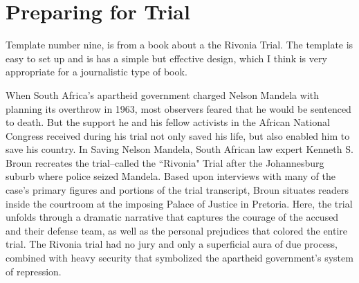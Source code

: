 \clearpage
{}
 \renewsection
\chapter{Preparing for Trial}

Template number nine, is from a book about a the Rivonia Trial. The template is easy to set up and is has a simple but effective design, which I think is very appropriate for a journalistic type of book. 
\medskip
\begin{figure}[ht]
\centering
{}
\end{figure}

When South Africa's apartheid government charged Nelson Mandela with planning its overthrow in 1963, most observers feared that he would be sentenced to death. But the support he and his fellow activists in the African National Congress received during his trial not only saved his life, but also enabled him to save his country. In Saving Nelson Mandela, South African law expert Kenneth S. Broun recreates the trial--called the ``Rivonia" Trial after the Johannesburg suburb where police seized Mandela. Based upon interviews with many of the case's primary figures and portions of the trial transcript, Broun situates readers inside the courtroom at the imposing Palace of Justice in Pretoria. Here, the trial unfolds through a dramatic narrative that captures the courage of the accused and their defense team, as well as the personal prejudices that colored the entire trial. The Rivonia trial had no jury and only a superficial aura of due process, combined with heavy security that symbolized the apartheid government's system of repression. 

